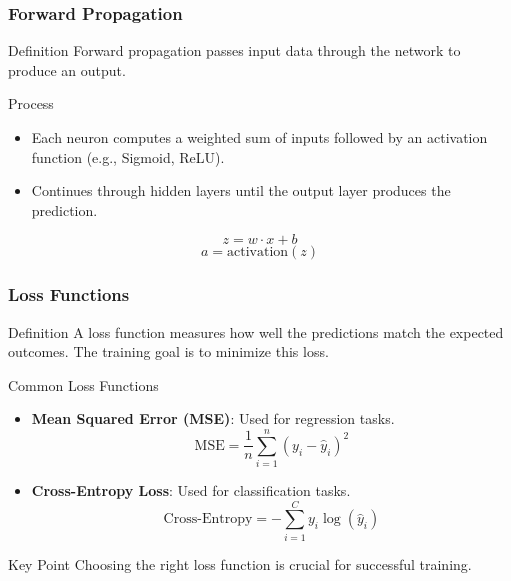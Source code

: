 \documentclass[aspectratio=169]{beamer}
\begin{document}
\begin{frame}[fragile]
    \frametitle{Forward Propagation}
    \begin{block}{Definition}
        Forward propagation passes input data through the network to produce an output.
    \end{block}
    \begin{block}{Process}
        \begin{itemize}
            \item Each neuron computes a weighted sum of inputs followed by an activation function (e.g., Sigmoid, ReLU).
            \item Continues through hidden layers until the output layer produces the prediction.
        \end{itemize}
    \end{block}
    \begin{equation}
        z = w \cdot x + b
    \end{equation}
    \begin{equation}
        a = \text{activation}(z)
    \end{equation}
\end{frame}

\begin{frame}[fragile]
    \frametitle{Loss Functions}
    \begin{block}{Definition}
        A loss function measures how well the predictions match the expected outcomes. The training goal is to minimize this loss.
    \end{block}
    \begin{block}{Common Loss Functions}
        \begin{itemize}
            \item \textbf{Mean Squared Error (MSE)}: Used for regression tasks.
            \begin{equation}
                \text{MSE} = \frac{1}{n} \sum_{i=1}^{n} (y_i - \hat{y}_i)^2
            \end{equation}
            \item \textbf{Cross-Entropy Loss}: Used for classification tasks.
            \begin{equation}
                \text{Cross-Entropy} = -\sum_{i=1}^{C} y_i \log(\hat{y}_i)
            \end{equation}
        \end{itemize}
    \end{block}
    \begin{block}{Key Point}
        Choosing the right loss function is crucial for successful training.
    \end{block}
\end{frame}
\end{document}

